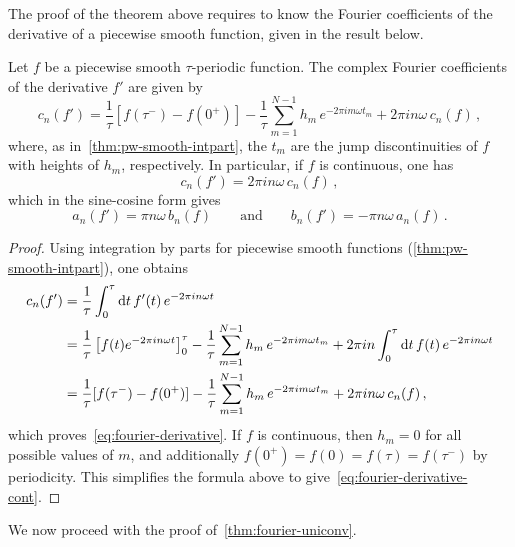 The proof of the theorem above requires to know the Fourier coefficients of the derivative
of a piecewise smooth function, given in the result below.
\begin{theorem}
  Let $f$ be a piecewise smooth $\tau$-periodic function. The complex Fourier coefficients
  of the derivative $f'$ are given by
  \begin{equation}
    c_n(f')=\frac{1}{\tau}[f(\tau^-)-f(0^+)]
    -\frac{1}{\tau}\sum_{m=1}^{N-1}h_m\,e^{-2\pi im\omega t_m}
    +2\pi i n\omega\,c_n(f)\,,\label{eq:fourier-derivative}
  \end{equation}
  where, as in~\cref{thm:pw-smooth-intpart}, the $t_m$ are the jump discontinuities of $f$
  with heights of $h_m$, respectively.  In particular, if $f$ is continuous, one has
  \begin{equation}
    c_n(f')=2\pi i n\omega\,c_n(f)\,,\label{eq:fourier-derivative-cont}
  \end{equation}
  which in the sine-cosine form gives
  \begin{equation}
    a_n(f')=\pi n\omega\,b_n(f)\qquad\text{and}\qquad b_n(f')=-\pi n\omega\,a_n(f)\,.
  \end{equation}
\end{theorem}
\begin{proof}
  Using integration by parts for piecewise smooth functions
  (\cref{thm:pw-smooth-intpart}), one obtains
  \begin{align}
    c_n(f')&=\frac{1}{\tau}\int_0^\tau\mathrm{d} t\,f'(t)\,e^{-2\pi i n\omega t}\\
    &=\frac{1}{\tau}\left[f(t)e^{-2\pi i n\omega t}\right]_0^\tau
    -\frac{1}{\tau}\sum_{m=1}^{N-1}h_m\,e^{-2\pi im\omega t_m}
    +2\pi i n\int_0^\tau\mathrm{d} t\,f(t)\,e^{-2\pi i n\omega t}\\
    &=\frac{1}{\tau}[f(\tau^-)-f(0^+)]
    -\frac{1}{\tau}\sum_{m=1}^{N-1}h_m\,e^{-2\pi im\omega t_m}
    +2\pi i n\omega\,c_n(f)\,,
  \end{align}
  which proves~\cref{eq:fourier-derivative}. If $f$ is continuous, then $h_m=0$ for all
  possible values of $m$, and additionally $f(0^+)=f(0)=f(\tau)=f(\tau^-)$ by periodicity.
  This simplifies the formula above to give~\cref{eq:fourier-derivative-cont}.
\end{proof}
We now proceed with the proof of~\cref{thm:fourier-uniconv}.
